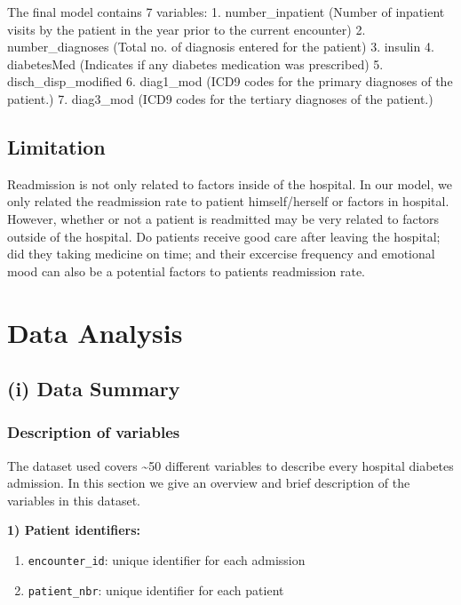 \documentclass[]{article}
\providecommand{\tightlist}{%
  \setlength{\itemsep}{0pt}\setlength{\parskip}{0pt}}
\begin{document}
The final model contains 7 variables: 1. number\_inpatient (Number of
inpatient visits by the patient in the year prior to the current
encounter) 2. number\_diagnoses (Total no. of diagnosis entered for the
patient) 3. insulin 4. diabetesMed (Indicates if any diabetes medication
was prescribed) 5. disch\_disp\_modified 6. diag1\_mod (ICD9 codes for
the primary diagnoses of the patient.) 7. diag3\_mod (ICD9 codes for the
tertiary diagnoses of the patient.)

\subsection{Limitation}\label{limitation}

Readmission is not only related to factors inside of the hospital. In
our model, we only related the readmission rate to patient
himself/herself or factors in hospital. However, whether or not a
patient is readmitted may be very related to factors outside of the
hospital. Do patients receive good care after leaving the hospital; did
they taking medicine on time; and their excercise frequency and
emotional mood can also be a potential factors to patients readmission
rate.

\section{Data Analysis}\label{data-analysis}

\subsection{(i) Data Summary}\label{i-data-summary}

\subsubsection{Description of variables}\label{description-of-variables}

The dataset used covers \textasciitilde{}50 different variables to
describe every hospital diabetes admission. In this section we give an
overview and brief description of the variables in this dataset.

\textbf{1) Patient identifiers:}

\begin{enumerate}
\def\labelenumi{\alph{enumi}.}
\tightlist
\item
  \texttt{encounter\_id}: unique identifier for each admission
\item
  \texttt{patient\_nbr}: unique identifier for each patient
\end{enumerate}
\end{document}
